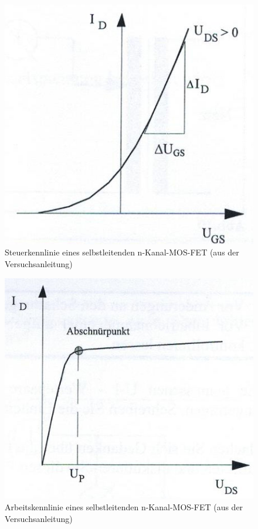 \documentclass{scrartcl}
\begin{document}
\begin{figure}[H]
  \centering
    \includegraphics[scale=0.75]{Kennlinie_Gate.JPG}
  \caption{Steuerkennlinie eines selbstleitenden n-Kanal-MOS-FET (aus der Versuchsanleitung)}
  \label{fig:Kennlinie_Gate}
\end{figure}

\begin{figure}[H]
  \centering
    \includegraphics[scale=0.75]{Kennlinie_Drain.JPG}
  \caption{Arbeitskennlinie eines selbstleitenden n-Kanal-MOS-FET (aus der Versuchsanleitung)}
  \label{fig:Kennlinie_Drain}
\end{figure}
\end{document}
